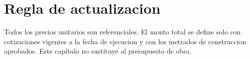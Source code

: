 \section{Regla de actualizacion}
Todos los precios unitarios son referenciales. El monto total se define solo
con cotizaciones vigentes a la fecha de ejecucion y con los metrados de
construccion aprobados. Este capítulo no sustituye al presupuesto de obra.
